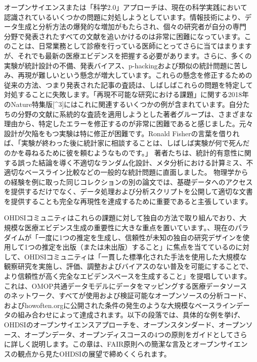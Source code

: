 \documentclass[
  11pt]{book}
\theoremstyle{definition}
\theoremstyle{definition}
\theoremstyle{definition}
\theoremstyle{definition}
\theoremstyle{remark}
\begin{document}
オープンサイエンスまたは「科学2.0」アプローチ\citep{wiki:Science_2.0}は、現在の科学実践において認識されているいくつかの問題に対処しようとしています。情報技術により、データ生成と分析方法の爆発的な増加がもたらされ、個々の研究者が自分の専門分野で発表されたすべての文献を追いかけるのは非常に困難になっています。このことは、日常業務として診療を行っている医師にとってさらに当てはまりますが、それでも最新の医療エビデンスを把握する必要があります。さらに、多くの実験が統計設計の不備、発表バイアス、p-hackingおよび類似の統計問題に苦しみ、再現が難しいという懸念が増大しています。これらの懸念を修正するための従来の方法、つまり発表された記事の査読は、しばしばこれらの問題を特定して対処することに失敗します。「再現不可能な研究における課題」に関する2018年のNature特集版{[}\^{}3{]}にはこれに関連するいくつかの例が含まれています。自分たちの分野の文献に系統的な査読を適用しようとした著者グループは、さまざまな理由から、特定したエラーを修正するのが非常に困難であると感じました。元々設計が欠陥をもつ実験は特に修正が困難です。Ronald Fisherの言葉を借りれば、「実験が終わった後に統計家に相談することは、しばしば実験が何で死んだのかを尋ねるために彼を頼むようなものです。」\citep{wikiquote:Ronald_Fisher} 著者たちは、統計的有意性に関する誤った結論を導く不適切なランダム化設計、メタ分析における計算ミス、不適切なベースライン比較などの一般的な統計問題に直面しました。\citep{allison_2016} 物理学からの経験を例に取った同じコレクションの別の論文では、基礎データへのアクセスを提供するだけでなく、データ処理および分析スクリプトを公開して適切な文書を提供することも完全な再現性を達成するために重要であると主張しています。\citep{Chen2018}

OHDSIコミュニティはこれらの課題に対して独自の方法で取り組んでおり、大規模な医療エビデンス生成の重要性に大きな重点を置いています。\citet{schuemie_2018bに述べられているように}、現在のパラダイムが「一度に1つの推定を生成し、信頼性が未知の独自の研究デザインを使用して1つの推定を出版（または未出版）すること」に焦点を当てているのに対して、OHDSIコミュニティは「一貫した標準化された手法を使用した大規模な観察研究を実施し、評価、調整およびバイアスのない普及を可能にすることで、より信頼性が高く完全なエビデンスベースを生成すること」を提唱しています。これは、OMOP共通データモデルにデータをマッピングする医療データソースのネットワーク、すべてが使用および検証可能なオープンソースの分析コード、およびhowoften.orgに公開された条件の発生のような大規模なベースラインデータの組み合わせによって達成されます。以下の段落では、具体的な例を挙げ、OHDSIのオープンサイエンスアプローチを、オープンスタンダード、オープンソース、オープンデータ、オープンディスコースの4つの原則をガイドとしてさらに詳しく説明します。この章は、FAIR原則への簡潔な言及とオープンサイエンスの観点から見たOHDSIの展望で締めくくられます。
\end{document}
